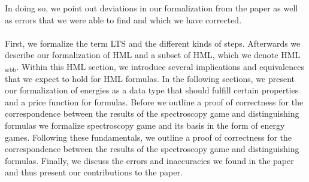 In doing so, we point out deviations in our formalization from the paper as well as errors that we were able to find and which we have corrected.
\\\\
First, we formalize the term LTS and the different kinds of steps.
Afterwards we describe our formalization of HML and a subset of HML, which we denote HML$_\text{srbb}$.
Within this HML section, we introduce several implications and equivalences that we expect to hold for HML formulas.
In the following sections, we present our formalization of energies as a data type that should fulfill certain properties and a price function for formulas.
Before we outline a proof of correctness for the correspondence between the results of the spectroscopy game and distinguishing formulas we formalize spectroscopy game and its basis in the form of energy games.
Following these fundamentals, we outline a proof of correctness for the correspondence between the results of the spectroscopy game and distinguishing formulas.
Finally, we discuss the errors and inaccuracies we found in the paper and thus present our contributions to the paper\cite{bisping2023lineartimebranchingtime}.